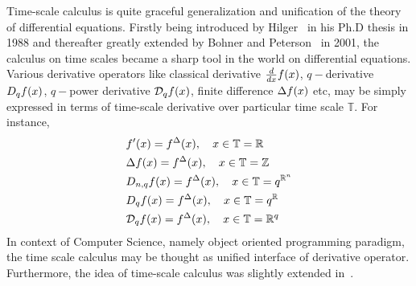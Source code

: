 Time-scale calculus is quite graceful generalization and unification of the theory of differential equations.
Firstly being introduced by Hilger~\cite{hilger1988ein} in his Ph.D thesis in 1988 and thereafter greatly
extended by Bohner and Peterson~\cite{Bohner2001DynamicEO} in 2001, the calculus on time scales became a sharp tool
in the world on differential equations.
Various derivative operators like classical derivative $\derivative{f(x)}{x}$, $q-$derivative $\qderivative{f(x)}$,
$q-$power derivative $\qpowerDerivative{f(x)}$, finite difference $\finiteDifference{f(x)}$ etc,
may be simply expressed in terms of time-scale derivative over particular time scale $\mathbb{T}$.
For instance,
\begin{align*}
    &f^\prime (x) = f^{\Delta} (x), \quad x\in\mathbb{T} = \mathbb{R} \\
    &\Delta f(x) = f^{\Delta} (x), \quad x\in\mathbb{T} = \mathbb{Z} \\
    &\nqderivative{f(x)} = f^{\Delta} (x), \quad x\in\mathbb{T} = q^{\mathbb{R}^n} \\
    &\qderivative{f(x)} = f^{\Delta} (x), \quad x\in\mathbb{T} = q^\mathbb{R} \\
    &\qpowerDerivative{f(x)} = f^{\Delta} (x), \quad x\in\mathbb{T} = \mathbb{R}^q
\end{align*}
In context of Computer Science, namely object oriented programming paradigm, the time scale calculus may be thought
as unified interface of derivative operator.
Furthermore, the idea of time-scale calculus was slightly extended
in~\cite{bayour2017truly,benkhettou2016conformable,caputo2009time,martins2009calculus}.

